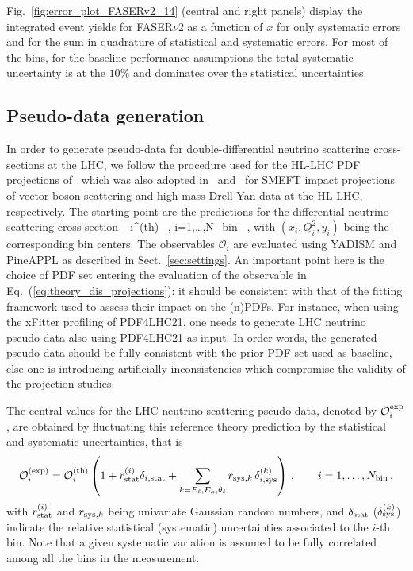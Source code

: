  Fig.~\ref{fig:error_plot_FASERv2_14} (central and right panels) display
 the integrated event yields for FASER$\nu$2 as a function of $x$ for only
 systematic errors and for the sum in quadrature of statistical and systematic errors.
 For most of the bins, for the baseline performance assumptions the total systematic
 uncertainty is at the $10\%$ and dominates over the statistical uncertainties.
 
 \subsection{Pseudo-data generation}

 In order to generate pseudo-data for double-differential
 neutrino scattering cross-sections at the LHC, we follow the procedure
 used for the HL-LHC PDF projections of~\cite{AbdulKhalek:2018rok} which was
 also adopted in~\cite{Ethier:2021ydt} and~\cite{Greljo:2021kvv} for SMEFT impact projections
 of vector-boson scattering and high-mass Drell-Yan data at the HL-LHC, respectively.
 The starting point are the predictions for the differential neutrino scattering
 cross-section
 \be
 \label{eq:theory_dis_projections}
 _i^{{\rm (th)}} \equiv {} \, ,\quad
 i=1,\ldots,N_{\rm bin} \, ,
 \ee
 with $(x_i,Q^2_i,y_i)$ being the corresponding bin centers.
 The observables $\mathcal{O}_i $ are evaluated using {\sc\small YADISM} and {\sc\small PineAPPL}
 as described in Sect.~\ref{sec:settings}.
 An important point here is the choice of PDF set entering the evaluation of
 the observable in Eq.~(\ref{eq:theory_dis_projections}): it should be consistent
 with that of the fitting framework used to assess their impact on the (n)PDFs.
 For instance, when using the {\sc\small xFitter} profiling of PDF4LHC21, one needs
 to generate LHC neutrino pseudo-data also using PDF4LHC21 as input.
 In order words, the generated pseudo-data should be fully consistent with the prior PDF
 set used as baseline, else one is introducing artificially inconsistencies which
 compromise the validity of the projection studies.
 
 The central values for the LHC neutrino scattering pseudo-data, denoted
 by $\mathcal{O}_i^{{\rm exp}} $, are obtained
 by fluctuating this reference theory prediction by the statistical and systematic
 uncertainties, that is
 \begin{equation}
  \label{eq:pseudo_data}
  \mathcal{O}_i^{{\rm (exp)}}  =   \mathcal{O}_i^{{\rm (th)}}\left( 1+ r^{(i)}_{\rm stat}\delta_{i,{\rm stat}}
  + \sum_{k=E_\ell, E_h,\theta_\ell} r_{{\rm sys},k} \,\delta_{i,{\rm sys}}^{(k)}\right) \, , \qquad i=1,\ldots,N_{\rm bin} \, ,
 \end{equation}
 with $r^{(i)}_{\rm stat}$ and $r_{{\rm sys},k}$ being univariate Gaussian random numbers,
 and $\delta_{\rm stat}$ ($\delta_{\rm sys}^{(k)}$) indicate the relative statistical (systematic)
 uncertainties associated to the $i$-th bin.
 Note that a given systematic variation is assumed to be fully correlated among all the bins
 in the measurement.

